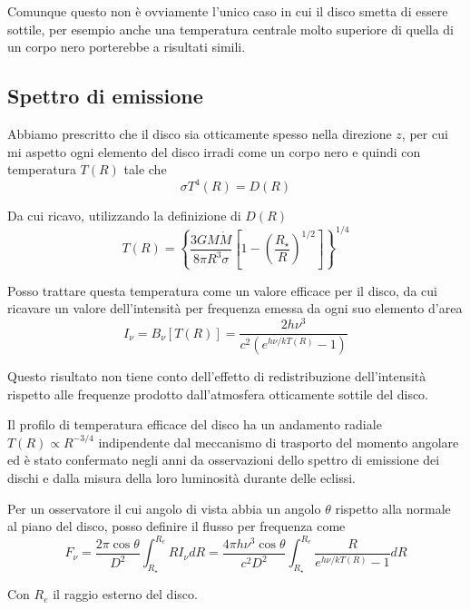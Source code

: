 \documentclass[a4paperbi]{article}
\begin{document}
	Comunque questo non è ovviamente l'unico caso in cui il disco smetta di essere sottile, per esempio anche una temperatura centrale molto superiore di quella di un corpo nero porterebbe a risultati simili.
	
\subsection{Spettro di emissione}
	Abbiamo prescritto che il disco sia otticamente spesso nella direzione $z$, per cui mi aspetto ogni elemento del disco irradi come un corpo nero e quindi con temperatura $T(R)$ tale che
	\begin{equation}
		\sigma T^4(R)=D(R)
	\end{equation}
	
	Da cui ricavo, utilizzando la definizione di $D(R)$
	\begin{equation}
		T(R)=\left\{\frac{3GM\dot{M}}{8\pi R^3\sigma}\left[1-\left(\frac{R_{\star}}{R}\right)^{1/2}\right]\right\}^{1/4}
	\end{equation}
	
	Posso trattare questa temperatura come un valore efficace per il disco, da cui ricavare un valore dell'intensità per frequenza emessa da ogni suo elemento d'area
	\begin{equation}
		I_\nu=B_\nu[T(R)]=\frac{2h\nu^3}{c^2(e^{h\nu/kT(R)}-1)}
	\end{equation}
	
	Questo risultato non tiene conto dell'effetto di redistribuzione dell'intensità rispetto alle frequenze prodotto dall'atmosfera otticamente sottile del disco.

	Il profilo di temperatura efficace del disco ha un andamento radiale $T(R)\propto R^{-3/4}$ indipendente dal meccanismo di trasporto del momento angolare ed è stato confermato negli anni da osservazioni dello spettro di emissione dei dischi e dalla misura della loro luminosità durante delle eclissi.
	
	Per un osservatore il cui angolo di vista abbia un angolo $\theta$ rispetto alla normale al piano del disco, posso definire il flusso per frequenza come
	\begin{equation}
		F_\nu=\frac{2\pi \cos{\theta}}{D^2}\int^{R_{e}}_{R_{\star}}RI_\nu dR=\frac{4\pi h\nu^3\cos{\theta}}{c^2D^2}\int^{R_{e}}_{R_{\star}}\frac{R}{e^{h\nu/kT(R)}-1}dR
	\end{equation}
	
	Con $R_e$ il raggio esterno del disco.
	
\end{document}
